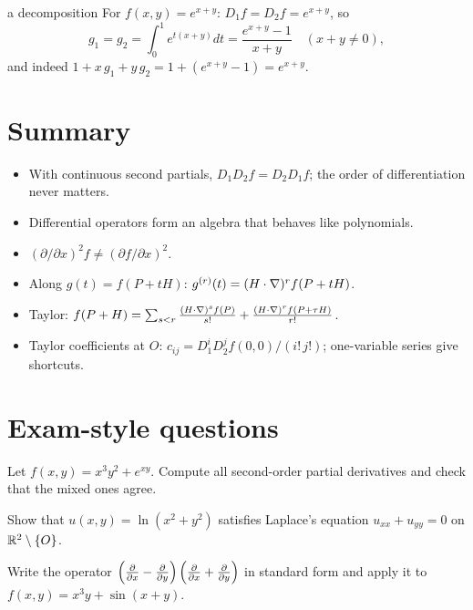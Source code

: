 \begin{example}{a decomposition}
For $f(x,y)=e^{x+y}$: $D_1f=D_2f=e^{x+y}$, so
\[ g_1=g_2=\int_0^1e^{t(x+y)}dt=\frac{e^{x+y}-1}{x+y}\quad(x+y\neq0), \]
and indeed $1+x\,g_1+y\,g_2=1+(e^{x+y}-1)=e^{x+y}$.
\end{example}

\section{Summary}

\begin{keyidea}
\begin{itemize}
  \item With continuous second partials, $D_1D_2f=D_2D_1f$; the order of differentiation never matters.
  \item Differential operators form an algebra that behaves like polynomials.
  \item $(\partial/\partial x)^2f\neq(\partial f/\partial x)^2$.
  \item Along $g(t)=f(P+tH)$: $g^{(r)}(t)=(H\cdot\nabla)^rf(P+tH)$.
  \item Taylor: $f(P+H)=\sum_{s<r}\frac{(H\cdot\nabla)^sf(P)}{s!}+\frac{(H\cdot\nabla)^rf(P+\tau H)}{r!}$.
  \item Taylor coefficients at $O$: $c_{ij}=D_1^iD_2^jf(0,0)/(i!\,j!)$; one-variable series give shortcuts.
\end{itemize}
\end{keyidea}

\section{Exam-style questions}

\begin{exercise}[1]
Let $f(x,y)=x^3y^2+e^{xy}$. Compute all second-order partial derivatives and check that
the mixed ones agree.
\end{exercise}

\begin{exercise}[1]
Show that $u(x,y)=\ln(x^2+y^2)$ satisfies Laplace's equation $u_{xx}+u_{yy}=0$ on
$\mathbb{R}^2\setminus\{O\}$.
\end{exercise}

\begin{exercise}[1]
Write the operator $\left(\frac{\partial }{\partial x}-\frac{\partial }{\partial y}\right)\left(\frac{\partial }{\partial x}+\frac{\partial }{\partial y}\right)$ in standard
form and apply it to $f(x,y)=x^3y+\sin(x+y)$.
\end{exercise}

